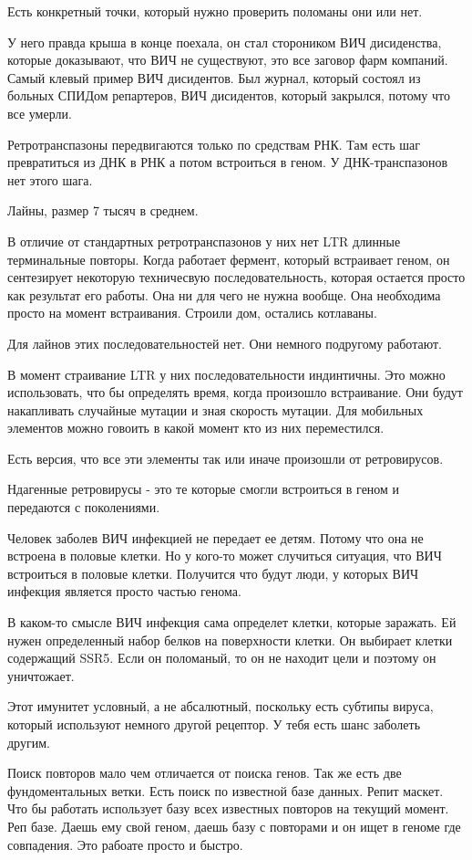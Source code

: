 Есть конкретный точки, который нужно проверить поломаны они или нет. 

У него правда крыша в конце поехала, он стал стороником ВИЧ дисиденства, 
которые доказывают, что ВИЧ не существуют, это все заговор фарм компаний. 
Самый клевый пример ВИЧ дисидентов. Был журнал, который состоял из
больных СПИДом репартеров, ВИЧ дисидентов, который закрылся, потому что 
все умерли. 

Ретротранспазоны передвигаются только по средствам РНК. Там есть шаг превратиться
из ДНК в РНК а потом встроиться в геном. У ДНК-транспазонов нет этого шага. 

Лайны, размер 7 тысяч в среднем. 

В отличие от стандартных ретротранспазонов у них нет LTR длинные терминальные повторы. 
Когда работает фермент, который встраивает геном, он сентезирует некоторую 
техничесвую последовательность, которая остается просто как результат его работы. 
Она ни для чего не нужна вообще. Она необходима просто на момент встраивания. Строили дом, остались 
котлаваны. 

Для лайнов этих последовательностей нет. Они немного подругому работают. 

В момент страивание LTR у них последовательности индинтичны. Это можно 
использовать, что бы определять время, когда произошло встраивание. 
Они будут накапливать случайные мутации и зная скорость мутации. 
Для мобильных элементов можно 
говоить в какой момент кто из них 
переместился. 

Есть версия, что все эти элементы так или иначе произошли от ретровирусов.

Ндагенные ретровирусы - это те которые смогли встроиться в геном и передаются с поколениями. 

Человек заболев ВИЧ инфекцией не передает ее детям. Потому что она не встроена в половые клетки. 
Но у кого-то может случиться ситуация, что ВИЧ встроиться в половые клетки. Получится что будут 
люди, у которых ВИЧ инфекция является просто частью генома. 

В каком-то смысле ВИЧ инфекция сама определет клетки, которые заражать. Ей нужен определенный 
набор белков на поверхности клетки. Он выбирает клетки содержащий SSR5. Если он поломаный, то 
он не находит цели и поэтому он уничтожает. 

Этот имунитет условный, а не абсалютный, поскольку есть субтипы вируса, который используют 
немного другой рецептор. У тебя есть шанс заболеть другим. 

Поиск повторов мало чем отличается от поиска генов. Так же есть две фундоментальных ветки. 
Есть поиск по известной базе данных. Репит маскет. Что бы работать использует базу 
всех известных повторов на текущий момент. Реп базе. Даешь ему свой геном, даешь 
базу с повторами и он ищет в геноме где совпадения. Это рабоате просто и быстро. 

